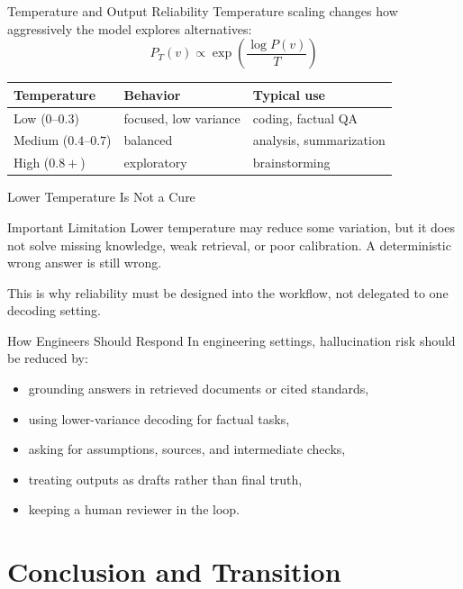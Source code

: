 \documentclass[12pt]{beamer}
\begin{document}
\begin{frame}{Temperature and Output Reliability}
  Temperature scaling changes how aggressively the model explores alternatives:
  \[
    P_T(v) \propto \exp\!\left(\frac{\log P(v)}{T}\right)
  \]

  \small
  \begin{tabular}{lll}
    \toprule
    \textbf{Temperature} & \textbf{Behavior} & \textbf{Typical use} \\
    \midrule
    Low ($0$--$0.3$) & focused, low variance & coding, factual QA \\
    Medium ($0.4$--$0.7$) & balanced & analysis, summarization \\
    High ($0.8+$) & exploratory & brainstorming \\
    \bottomrule
  \end{tabular}
\end{frame}

\begin{frame}{Lower Temperature Is Not a Cure}
  \begin{warningbox}{Important Limitation}
    Lower temperature may reduce some variation, but it does not solve missing knowledge, weak retrieval, or poor calibration. A deterministic wrong answer is still wrong.
  \end{warningbox}

  This is why reliability must be designed into the workflow, not delegated to one decoding setting.
\end{frame}

\begin{frame}{How Engineers Should Respond}
  In engineering settings, hallucination risk should be reduced by:
  \begin{itemize}
    \item grounding answers in retrieved documents or cited standards,
    \item using lower-variance decoding for factual tasks,
    \item asking for assumptions, sources, and intermediate checks,
    \item treating outputs as drafts rather than final truth,
    \item keeping a human reviewer in the loop.
  \end{itemize}
\end{frame}

\section{Conclusion and Transition}
\end{document}
